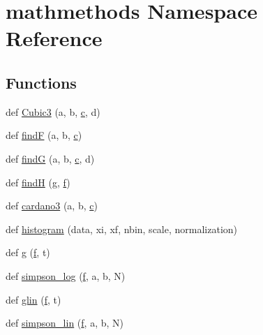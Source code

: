 \hypertarget{namespacemathmethods}{}\section{mathmethods Namespace Reference}
\label{namespacemathmethods}
\subsection*{Functions}
\begin{DoxyCompactItemize}
\item 
def \hyperlink{namespacemathmethods_a8543e272b8384b6393e19ce842e2e50f}{Cubic3} (a, b, \hyperlink{constants_8h_a8fc6defe4e499b1b9b9c275689e44352}{c}, d)
\item 
def \hyperlink{namespacemathmethods_a30cb2db3d58d8972704dd5e4af463a5f}{findF} (a, b, \hyperlink{constants_8h_a8fc6defe4e499b1b9b9c275689e44352}{c})
\item 
def \hyperlink{namespacemathmethods_a22816e0deeb8aeb5093ee56c40a2f0ed}{findG} (a, b, \hyperlink{constants_8h_a8fc6defe4e499b1b9b9c275689e44352}{c}, d)
\item 
def \hyperlink{namespacemathmethods_a81711f80750b9ec11d8bdea628ec2808}{findH} (\hyperlink{namespacemathmethods_ac31111223c9bdad18dca6586c9c91785}{g}, \hyperlink{namespacemathmethods_ac945e4655c6b407054fa4553f05f50ef}{f})
\item 
def \hyperlink{namespacemathmethods_a3137142e19831d72cff91377382f1def}{cardano3} (a, b, \hyperlink{constants_8h_a8fc6defe4e499b1b9b9c275689e44352}{c})
\item 
def \hyperlink{namespacemathmethods_a65d2eaef2e9376f85d580ee0e9a841c6}{histogram} (data, xi, xf, nbin, scale, normalization)
\item 
def \hyperlink{namespacemathmethods_ac31111223c9bdad18dca6586c9c91785}{g} (\hyperlink{namespacemathmethods_ac945e4655c6b407054fa4553f05f50ef}{f}, t)
\item 
def \hyperlink{namespacemathmethods_a1083810dcaa88792a88cb2fa019cc808}{simpson\+\_\+log} (\hyperlink{namespacemathmethods_ac945e4655c6b407054fa4553f05f50ef}{f}, a, b, N)
\item 
def \hyperlink{namespacemathmethods_a0fb68fc053fd07ac6147303e63e078dd}{glin} (\hyperlink{namespacemathmethods_ac945e4655c6b407054fa4553f05f50ef}{f}, t)
\item 
def \hyperlink{namespacemathmethods_a04d1b19b7bbc80ee46a405193fb54043}{simpson\+\_\+lin} (\hyperlink{namespacemathmethods_ac945e4655c6b407054fa4553f05f50ef}{f}, a, b, N)

\end{DoxyCompactItemize}
